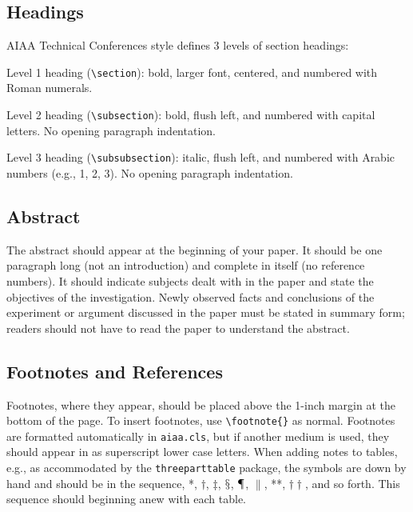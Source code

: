 \documentclass{aiaa-tc}%
\newcommand{\pkg}[1]{\texttt{#1}}
\begin{document}
\subsection{Headings}

AIAA Technical Conferences style defines 3 levels of section
headings:
\begin{description}
 \item Level 1 heading (\verb"\section"): bold, larger font, centered,
       and numbered with Roman numerals.
 \item Level 2 heading (\verb"\subsection"): bold, flush left, and
       numbered with capital letters.  No opening paragraph indentation.
 \item Level 3 heading (\verb"\subsubsection"): italic, flush left, and
       numbered with Arabic numbers (e.g., 1, 2, 3).  No opening
       paragraph indentation.
\end{description}

\subsection{Abstract}

The abstract should appear at the beginning of your paper.
It should be one paragraph long (not an introduction) and complete in
itself (no reference numbers).
It should indicate subjects dealt with in the paper and state the
objectives of the investigation.
Newly observed facts and conclusions of the experiment or argument
discussed in the paper must be stated in summary form; readers should
not have to read the paper to understand the abstract.

\subsection{Footnotes and References}

Footnotes, where they appear, should be placed above the 1-inch margin at
the bottom of the page.
To insert footnotes, use \verb|\footnote{}| as normal.
Footnotes are formatted automatically in \verb|aiaa.cls|, but if
another medium is used, they should appear in as superscript lower case
letters.
When adding notes to tables, e.g., as accommodated by the
\pkg{threeparttable} package, the symbols are down by hand and should be
in the sequence, *, $\dagger$, $\ddagger$, $\mathsection$,
$\mathparagraph$, $\|$, **, $\dagger\dagger$, and so forth.
This sequence should beginning anew with each table.
\end{document}
